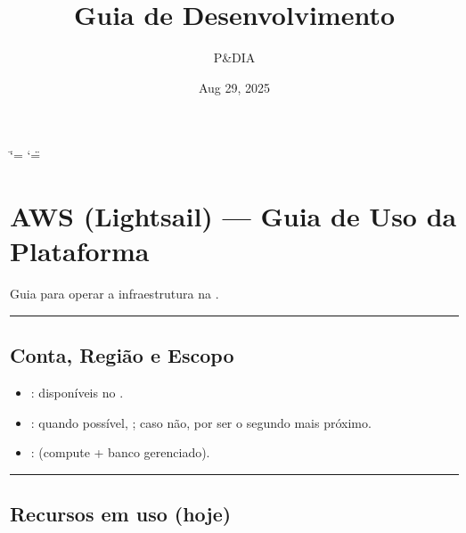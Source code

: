 \documentclass[letterpaper,10pt,brazil]{sphinxmanual}
\title{Guia de Desenvolvimento}
\date{Aug 29, 2025}
\author{P\&D\sphinxhyphen{}IA}
\begin{document}
\ifdefined\shorthandoff
  \ifnum\catcode`\=\string=\active\shorthandoff{=}\fi
  \ifnum\catcode`\"=\active{}\fi
\fi

\pagestyle{empty}
\sphinxmaketitle
\pagestyle{plain}
\sphinxtableofcontents
\pagestyle{normal}
\label{\detokenize{index::doc}}


\sphinxstepscope


\chapter{AWS (Lightsail) — Guia de Uso da Plataforma}
\label{\detokenize{sistemas/aws:aws-lightsail-guia-de-uso-da-plataforma}}\label{\detokenize{sistemas/aws::doc}}
\sphinxAtStartPar
Guia para operar a infraestrutura na .


\bigskip\hrule\bigskip



\section{Conta, Região e Escopo}
\label{\detokenize{sistemas/aws:conta-regiao-e-escopo}}\begin{itemize}
\item {} 
\sphinxAtStartPar
{}: disponíveis no .

\item {} 
\sphinxAtStartPar
{}: quando possível, ; caso não,  por ser o segundo mais próximo.

\item {} 
\sphinxAtStartPar
{}:  (compute + banco gerenciado).

\end{itemize}


\bigskip\hrule\bigskip



\section{Recursos em uso (hoje)}
\label{\detokenize{sistemas/aws:recursos-em-uso-hoje}}
\end{document}
